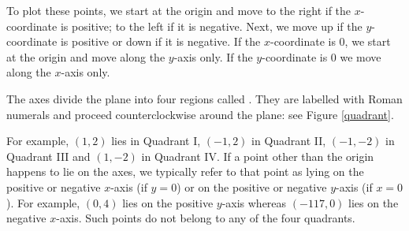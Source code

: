 




{
To plot these points, we start at the origin and move to the right if the $x$-coordinate is positive; to the left if it is negative.   Next, we move up if the $y$-coordinate is positive or down if it is negative.  If the $x$-coordinate is $0$, we start at the origin and move along the $y$-axis only.  If the  $y$-coordinate is $0$ we move along the $x$-axis only.


\begin{center}


\end{center}
}

\medskip

\pagebreak

The axes divide the plane into four regions called  .  They are labelled with Roman numerals and proceed counterclockwise around the plane: see Figure \ref{quadrant}.



For example, $(1,2)$ lies in Quadrant I, $(-1,2)$ in Quadrant II, $(-1,-2)$ in Quadrant III and $(1,-2)$ in Quadrant IV.  If a point other than the origin happens to lie on the axes, we typically refer to that point as lying on the positive or negative $x$-axis (if $y = 0$) or on the positive or negative $y$-axis (if $x = 0$).  For example, $(0,4)$ lies on the positive $y$-axis whereas $(-117,0)$ lies on the negative $x$-axis.  Such points do not belong to any of the four quadrants.

